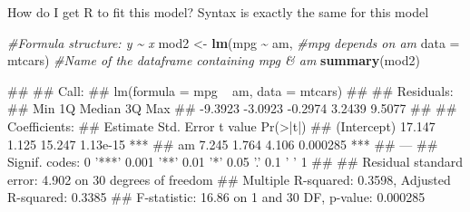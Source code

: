 \documentclass[
  ignorenonframetext,
  aspectratio=169]{beamer}
\newenvironment{Shaded}{\begin{snugshade}}{\end{snugshade}}
\newcommand{\AttributeTok}[1]{\textcolor[rgb]{0.13,0.29,0.53}{#1}}
\newcommand{\CommentTok}[1]{\textcolor[rgb]{0.56,0.35,0.01}{\textit{#1}}}
\newcommand{\FunctionTok}[1]{\textcolor[rgb]{0.13,0.29,0.53}{\textbf{#1}}}
\newcommand{\NormalTok}[1]{#1}
\newcommand{\OtherTok}[1]{\textcolor[rgb]{0.56,0.35,0.01}{#1}}
\newcommand{\SpecialCharTok}[1]{\textcolor[rgb]{0.81,0.36,0.00}{\textbf{#1}}}
\let\oldShaded\Shaded %
\let\endoldShaded\endShaded
\renewenvironment{Shaded}{\scriptsize\oldShaded}{\endoldShaded}
\let\oldverbatim\verbatim %
\let\endoldverbatim\endverbatim
\renewenvironment{verbatim}{\tiny\oldverbatim}{\endoldverbatim}
\begin{document}
\begin{frame}[fragile]{How do I get R to fit this model?}
\protect\hypertarget{how-do-i-get-r-to-fit-this-model-1}{}
Syntax is exactly the same for this model

\tiny

\begin{Shaded}
\begin{Highlighting}[]
\CommentTok{\#Formula structure: y \textasciitilde{} x}
\NormalTok{mod2 }\OtherTok{\textless{}{-}} \FunctionTok{lm}\NormalTok{(mpg }\SpecialCharTok{\textasciitilde{}}\NormalTok{ am, }\CommentTok{\#mpg depends on am}
           \AttributeTok{data =}\NormalTok{ mtcars) }\CommentTok{\#Name of the dataframe containing mpg \& am}
\FunctionTok{summary}\NormalTok{(mod2)}
\end{Highlighting}
\end{Shaded}

\begin{verbatim}
## 
## Call:
## lm(formula = mpg ~ am, data = mtcars)
## 
## Residuals:
##     Min      1Q  Median      3Q     Max 
## -9.3923 -3.0923 -0.2974  3.2439  9.5077 
## 
## Coefficients:
##             Estimate Std. Error t value Pr(>|t|)    
## (Intercept)   17.147      1.125  15.247 1.13e-15 ***
## am             7.245      1.764   4.106 0.000285 ***
## ---
## Signif. codes:  0 '***' 0.001 '**' 0.01 '*' 0.05 '.' 0.1 ' ' 1
## 
## Residual standard error: 4.902 on 30 degrees of freedom
## Multiple R-squared:  0.3598, Adjusted R-squared:  0.3385 
## F-statistic: 16.86 on 1 and 30 DF,  p-value: 0.000285
\end{verbatim}
\end{frame}
\end{document}
